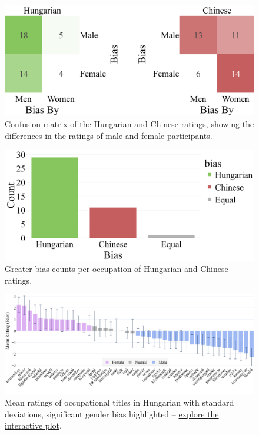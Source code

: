 \documentclass[11pt]{article}
\begin{document}
\bigskip

\begin{figure}[b]
  \centering
  \includegraphics[width=\linewidth]{../confusion_matrices}
  \caption{Confusion matrix of the Hungarian and Chinese ratings, showing the differences in the ratings of male and female participants.}  
  \label{fig:confusion_matrices}
\end{figure}

\begin{figure}[b]
  \centering
  \includegraphics[width=\linewidth]{../bias_counts}
  \caption{Greater bias counts per occupation of Hungarian and Chinese ratings.}  
  \label{fig:bias_counts}
\end{figure}



\begin{figure}[!ht]
  \centering
  \includegraphics[width=\linewidth]{../occupations_hu}
  \caption{Mean ratings of occupational titles in Hungarian with standard deviations, significant gender bias highlighted -- \href{https://anonymous.4open.science/api/repo/occupational-bias-paclic39/file/occupations_hu.html?v=93359859}{explore the interactive plot}.}
  \label{fig:occupations_hu}
\end{figure}
\end{document}
